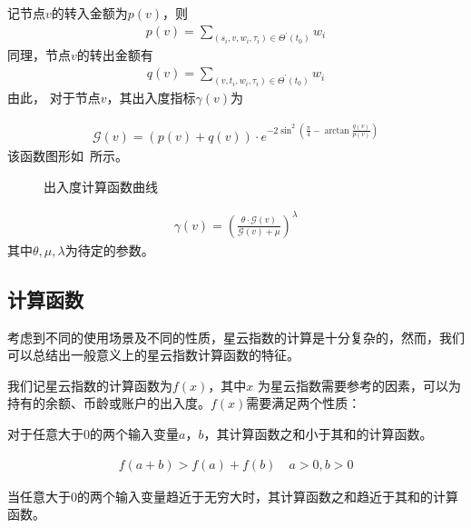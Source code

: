 
记节点$v$的转入金额为$p(v)$，则
\begin{align}
p(v) = \sum_{(s_i, v, w_i, \tau_i) \in \Theta^{\prime}(t_0)}{w_i}
\end{align}
\noindent 同理，节点$v$的转出金额有
\begin{align}
q(v) = \sum_{(v, t_i, w_i, \tau_i) \in \Theta^{\prime}(t_0)}{w_i}
\end{align}
\noindent 由此，
对于节点$v$，其出入度指标$\gamma(v)$为

\begin{align}
\mathcal{G}(v) = (p(v) + q(v)) \cdot e^{-2\sin^2{(\frac{\pi}{4} - \arctan\frac{q(v)}{p(v)})}}
\end{align}
\noindent 该函数图形如~所示。
\begin{figure}
  \centering
  
\caption{出入度计算函数曲线 \label{fig-surf}}
\end{figure}

\begin{align}
\gamma(v) = (\frac{\theta\cdot \mathcal{G}(v)}{\mathcal{G}(v) + \mu})^{\lambda}
\end{align}
\noindent 其中$\theta, \mu, \lambda$为待定的参数。


\subsection{计算函数 \label{sec:function}}
考虑到不同的使用场景及不同的性质，星云指数的计算是十分复杂的，然而，我们可以总结出一般意义上的星云指数计算函数的特征。

我们记星云指数的计算函数为\(f(x)\)，其中\(x\)
为星云指数需要参考的因素，可以为持有的余额、币龄或账户的出入度。$f(x)$需要满足两个性质：

\begin{property}
\label{prop:one}
对于任意大于$0$的两个输入变量$a$，$b$，其计算函数之和小于其和的计算函数。
\end{property}

\begin{align}
f(a+b)>f(a)+f(b) \quad a>0,b>0
\end{align}

\begin{property}
\label{prop:two}
当任意大于$0$的两个输入变量趋近于无穷大时，其计算函数之和趋近于其和的计算函数。
\end{property}

